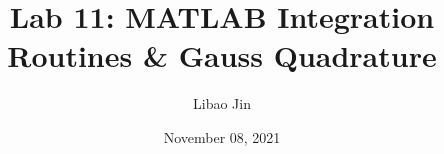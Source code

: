 \title{Lab 11: MATLAB Integration Routines \& Gauss Quadrature}
\author{Libao Jin}
\date{November 08, 2021}